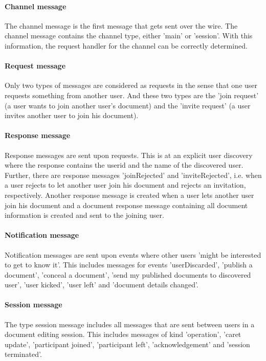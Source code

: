 \paragraph{Channel message}
The channel message is the first message that gets sent over the wire. The channel message contains the channel type, either 'main' or 'session'. With this information, the request handler for the channel can be correctly determined.

\paragraph{Request message}
Only two types of messages are considered as requests in the sense that one user requests something from another user. And these two types are the 'join request' (a user wants to join another user's document) and the 'invite request' (a user invites another user to join his document).

\paragraph{Response message}
Response messages are sent upon requests. This is at an explicit user discovery where the response contains the userid and the name of the discovered user. Further, there are response messages 'joinRejected' and 'inviteRejected', i.e. when a user rejects to let another user join his document and rejects an invitation, respectively. Another response message is created when a user lets another user join his document and a document response message containing all document information is created and sent to the joining user.

\paragraph{Notification message}
Notification messages are sent upon events where other users 'might be interested to get to know it'. This includes messages for events 'userDiscarded', 'publish a document', 'conceal a document', 'send my published documents to discovered user', 'user kicked', 'user left' and 'document details changed'.

\paragraph{Session message}
The type session message includes all messages that are sent between users in a document editing session. This includes messages of kind 'operation', 'caret update', 'participant joined', 'participant left', 'acknowledgement' and 'session terminated'.



